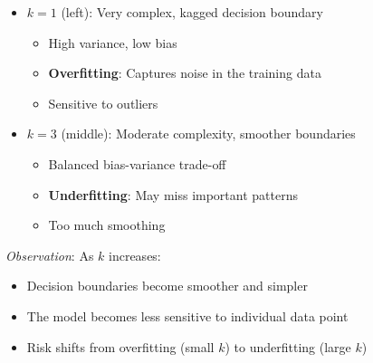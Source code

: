 \documentclass[a4paper]{article}
\theoremstyle{definition}
\begin{document}
\begin{itemize}
    \item \( k = 1 \) (left): Very complex, kagged decision boundary 
    \begin{itemize}
        \item High variance, low bias 
        \item \textbf{Overfitting}: Captures noise in the training data 
        \item Sensitive to outliers
    \end{itemize}
    \item \( k = 3 \) (middle): Moderate complexity, smoother boundaries 
    \begin{itemize}
        \item Balanced bias-variance trade-off 
        \item \textbf{Underfitting}: May miss important patterns 
        \item Too much smoothing
    \end{itemize}
\end{itemize}
\textit{Observation}: As \( k \) increases:
\begin{itemize}
    \item Decision boundaries become smoother and simpler 
    \item The model becomes less sensitive to individual data point 
    \item Risk shifts from overfitting (small \( k \)) to underfitting (large \( k \))
\end{itemize}
\end{document}
